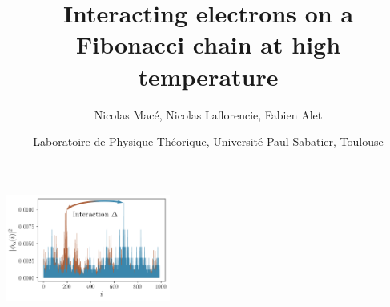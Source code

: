 \begin{frame}
\title{Interacting electrons on a Fibonacci chain at high temperature}
\author{Nicolas Macé, Nicolas Laflorencie, Fabien Alet}
\date{Laboratoire de Physique Théorique, Université Paul Sabatier, Toulouse}
%
\titlepage
%
\btVFill

\centering
\includegraphics[height=3.5cm]{img/0_cover/free_two_densities_interaction}

\end{frame}
